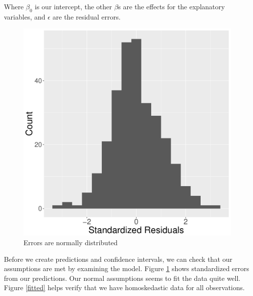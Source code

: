 \documentclass{article}
\begin{document}
Where $\beta_0$ is our intercept, the other $\beta$s are the effects for the explanatory variables, and $\epsilon$ are the residual errors.
\begin{figure}
\centering
\includegraphics[scale=.3]{resids.pdf}
\caption{Errors are normally distributed}
\label{resid}
\end{figure}

Before we create predictions and confidence intervals, we can check that our assumptions are met by examining the model. Figure \ref{resid} shows standardized errors from our predictions. Our normal assumptions seems to fit the data quite well. Figure \ref{fitted} helps verify that we have homoskedastic data for all observations.  
\end{document}
